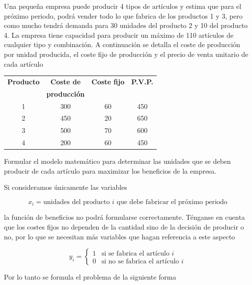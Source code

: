 \begin{ejemplo}
    Una pequeña empresa puede producir 4 tipos de artículos y estima que para el próximo periodo, podrá vender todo lo que 
    fabrica de los productos 1 y 3, pero como mucho tendrá demanda para 30 unidades del producto 2 y 10 del producto 4. La 
    empresa tiene capacidad para producir un máximo de 110 artículos de cualquier tipo y combinación. A continuación se 
    detalla el coste de producción por unidad producida, el coste fijo de producción y el precio de venta unitario de 
    cada artículo

    \begin{center}
        \begin{tabular}{|c|c|c|c|}
        \hline
        \textbf{Producto} & \textbf{Coste de} & \textbf{Coste fijo} & \textbf{P.V.P.} \\
         & \textbf{producción} & & \\
        \hline
        1 & 300 & 60 & 450 \\
        2 & 450 & 20 & 650 \\
        3 & 500 & 70 & 600 \\
        4 & 200 & 60 & 450 \\
        \hline
        \end{tabular}
    \end{center}
    
    Formular el modelo matemático para determinar las unidades que se deben producir de cada artículo para maximizar los
    beneficios de la empresa.
\end{ejemplo}

Si consideramos únicamente las variables 

\[
    x_i=\text{unidades del producto } i\text{ que debe fabricar el próximo periodo}
\]

la función de beneficios no podrá formularse correctamente. Ténganse en cuenta que los costes fijos no dependen de la cantidad
sino de la decisión de producir o no, por lo que se necesitan más variables que hagan referencia a este aspecto

\[
    y_i=
    \begin{cases}
        1 & \text{si se fabrica el artículo } i \\
        0 & \text{si no se fabrica el artículo } i
    \end{cases}
\]

Por lo tanto se formula el problema de la siguiente forma

